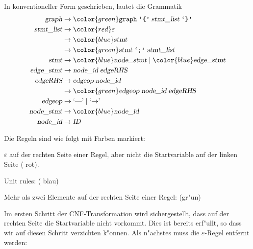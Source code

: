 \begin{loesung}
\begin{teilaufgaben}
\item In konventioneller Form geschrieben, lautet die Grammatik
\begin{align*}
\textsl{graph}     &\rightarrow {\color{green}\texttt{graph}\; \texttt{`\{'}\; \textsl{stmt\_list}\; \texttt{`\}'}} \\
\textsl{stmt\_list}&\rightarrow {\color{red}\varepsilon}\\
                   &\rightarrow {\color{blue}\textsl{stmt}}\\
                   &\rightarrow {\color{green}\textsl{stmt}\; \texttt{`;'}\; \textsl{stmt\_list}}\\
\textsl{stmt}      &\rightarrow {\color{blue}\textsl{node\_stmt}}\; |\;
                                {\color{blue}\textsl{edge\_stmt}} \\
\textsl{edge\_stmt}&\rightarrow \textsl{node\_id}\; \textsl{edgeRHS} \\
\textsl{edgeRHS}   &\rightarrow \textsl{edgeop}\; \textsl{node\_id}\\
                   &\rightarrow {\color{green}\textsl{edgeop}\; \textsl{node\_id}\; \textsl{edgeRHS}}\\
\textsl{edgeop}    &\rightarrow \textrm{`\text{---}'}\; |\; \textrm{`$\rightarrow$'}\; \\
\textsl{node\_stmt}&\rightarrow {\color{blue}\textsl{node\_id}} \\
\textsl{node\_id}  &\rightarrow {\textsl{ID}}
\end{align*}
\item Die Regeln sind wie folgt mit Farben markiert:
\begin{compactenum}
\item $\varepsilon$ auf der rechten Seite einer Regel, aber nicht die
Startvariable auf der linken Seite ({\color{red} rot}).
\item Unit rules: ({\color{blue} blau})
\item Mehr als zwei Elemente auf der rechten Seite einer Regel:
({\color{green}gr"un})
\end{compactenum}
\item Im ersten Schritt der CNF-Transformation wird sichergestellt, dass
auf der rechten Seite die Startvariable nicht vorkommt.
Dies ist bereits erf"ullt, so dass wir auf diesen Schritt verzichten k"onnen.
Als n"achstes muss die $\varepsilon$-Regel entfernt werden:
\begin{align*}

\end{align*}
\end{teilaufgaben}
\end{loesung}

